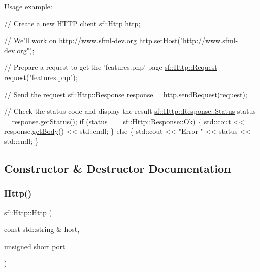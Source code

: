 Usage example\+: 
\begin{DoxyCode}
\textcolor{comment}{// Create a new HTTP client}
\hyperlink{classsf_1_1_http}{sf::Http} http;

\textcolor{comment}{// We'll work on http://www.sfml-dev.org}
http.\hyperlink{classsf_1_1_http_a55121d543b61c41cf20b885a97b04e65}{setHost}(\textcolor{stringliteral}{"http://www.sfml-dev.org"});

\textcolor{comment}{// Prepare a request to get the 'features.php' page}
\hyperlink{classsf_1_1_http_1_1_request}{sf::Http::Request} request(\textcolor{stringliteral}{"features.php"});

\textcolor{comment}{// Send the request}
\hyperlink{classsf_1_1_http_1_1_response}{sf::Http::Response} response = http.\hyperlink{classsf_1_1_http_aaf09ebfb5e00dcc82e0d494d5c6a9e2a}{sendRequest}(request);

\textcolor{comment}{// Check the status code and display the result}
\hyperlink{classsf_1_1_http_1_1_response_a663e071978e30fbbeb20ed045be874d8}{sf::Http::Response::Status} status = response.\hyperlink{classsf_1_1_http_1_1_response_a4271651703764fd9a7d2c0315aff20de}{getStatus}();
\textcolor{keywordflow}{if} (status == \hyperlink{classsf_1_1_http_1_1_response_a663e071978e30fbbeb20ed045be874d8a0158f932254d3f09647dd1f64bd43832}{sf::Http::Response::Ok})
\{
    std::cout << response.\hyperlink{classsf_1_1_http_1_1_response_ab3bfc29867563aa815f6460eeea16136}{getBody}() << std::endl;
\}
\textcolor{keywordflow}{else}
\{
    std::cout << \textcolor{stringliteral}{"Error "} << status << std::endl;
\}
\end{DoxyCode}
 

\subsection{Constructor \& Destructor Documentation}
\mbox{\label{classsf_1_1_http_a79efd844a735f083fcce0edbf1092385}} 
\subsubsection{\texorpdfstring{Http()}{Http()}}
{\footnotesize\ttfamily sf\+::\+Http\+::\+Http (\begin{DoxyParamCaption}\item[{const std\+::string \&}]{host,  }\item[{unsigned short}]{port = {} }\end{DoxyParamCaption})}



